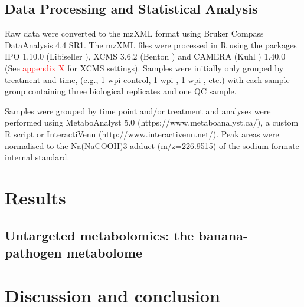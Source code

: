 \subsection{Data Processing and Statistical Analysis}
Raw data were converted to the mzXML format using Bruker Compass DataAnalysis 4.4 SR1. The mzXML files were processed in R using the packages IPO 1.10.0 (Libiseller ), XCMS 3.6.2 (Benton ) and CAMERA (Kuhl ) 1.40.0 (See \textcolor{red}{appendix X} for XCMS settings). Samples were initially only grouped by treatment and time, (e.g., 1 wpi control, 1 wpi \Foc, 1 wpi \Xvm, etc.) with each sample group containing three biological replicates and one QC sample. 

Samples were grouped by time point and/or treatment and analyses were performed using MetaboAnalyst 5.0 (https://www.metaboanalyst.ca/), a custom R script or InteractiVenn (http://www.interactivenn.net/). Peak areas were normalised to the Na(NaCOOH)3 adduct (m/z=226.9515) of the sodium formate internal standard. 

\newpage
\section{Results}
\subsection{Untargeted metabolomics: the banana-pathogen metabolome}

\newpage
\section{Discussion and conclusion}
